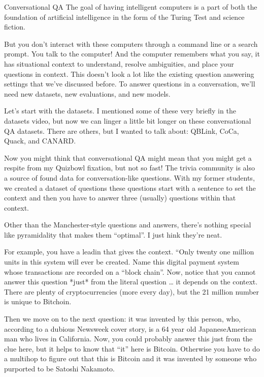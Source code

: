 

Conversational QA
The goal of having intelligent computers is a part of both the foundation of artificial intelligence in the form of the Turing Test and science fiction.

But you don’t interact with these computers through a command line or a search prompt.  You talk to the computer!  And the computer remembers what you say, it has situational context to understand, resolve ambiguities, and place your questions in context.  
This doesn’t look a lot like the existing question answering settings that we’ve discussed before.  To answer questions in a conversation, we’ll need new datasets, new evaluations, and new models.

Let’s start with the datasets.  I mentioned some of these very briefly in the datasets video, but now we can linger a little bit longer on these conversational QA datasets.  There are others, but I wanted to talk about: QBLink, CoCa, Quack, and CANARD.  

Now you might think that conversational QA might mean that you might get a respite from my Quizbowl fixation, but not so fast!  The trivia community is also a source of found data for conversation-like questions.  With my former students, we created a dataset of questions these questions start with a sentence to set the context and then you have to answer three (usually) questions within that context.  

Other than the Manchester-style questions and answers, there’s nothing special like pyramidality that makes them “optimal”.  I just hink they’re neat.

For example, you have a leadin that gives the context.  “Only twenty­ one million units in this system will ever be created. Name this digital payment system whose transactions are recorded on a “block chain”. Now, notice that you cannot answer this question *just* from the literal question … it depends on the context.  There are plenty of cryptocurrencies (more every day), but the 21 million number is unique to Bitchoin.

Then we move on to the next question: it was invented by this person, who, according to a dubious Newsweek cover story, is a 64­ year ­old Japanese­American man who lives in California.  Now, you could probably answer this just from the clue here, but it helps to know that “it” here is Bitcoin.  Otherwise you have to do a multihop to figure out that this is Bitcoin and it was invented by someone who purported to be Satoshi Nakamoto.

